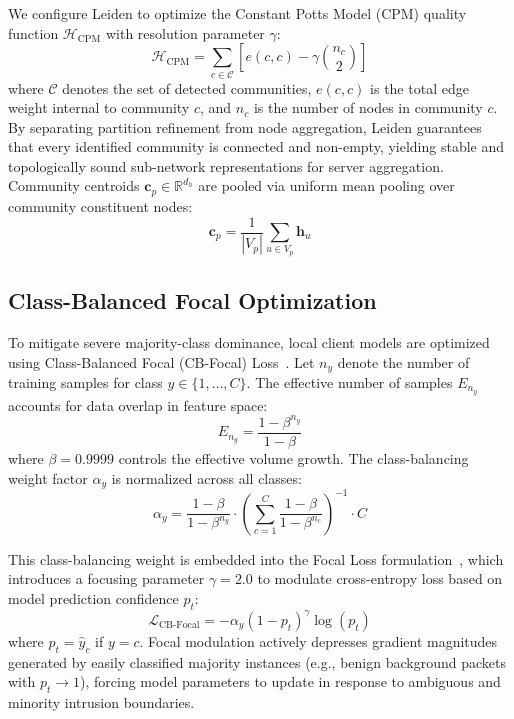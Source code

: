 \documentclass[journal,onecolumn]{IEEEtran}
\begin{document}
We configure Leiden to optimize the Constant Potts Model (CPM) quality function $\mathcal{H}_{\text{CPM}}$ with resolution parameter $\gamma$:
\begin{equation}
\mathcal{H}_{\text{CPM}} = \sum_{c \in \mathcal{C}} \left[ e(c, c) - \gamma \binom{n_c}{2} \right]
\label{eq:leiden_cpm}
\end{equation}
where $\mathcal{C}$ denotes the set of detected communities, $e(c, c)$ is the total edge weight internal to community $c$, and $n_c$ is the number of nodes in community $c$. By separating partition refinement from node aggregation, Leiden guarantees that every identified community is connected and non-empty, yielding stable and topologically sound sub-network representations for server aggregation. Community centroids $\boldsymbol{c}_p \in \mathbb{R}^{d_h}$ are pooled via uniform mean pooling over community constituent nodes:
\begin{equation}
\boldsymbol{c}_p = \frac{1}{|V_p|} \sum_{u \in V_p} \boldsymbol{h}_u
\label{eq:community_pooling}
\end{equation}

\subsection{Class-Balanced Focal Optimization}
To mitigate severe majority-class dominance, local client models are optimized using Class-Balanced Focal (CB-Focal) Loss~\cite{cui2019cbloss, lin2017focal}. Let $n_y$ denote the number of training samples for class $y \in \{1, \dots, C\}$. The effective number of samples $E_{n_y}$ accounts for data overlap in feature space:
\begin{equation}
E_{n_y} = \frac{1 - \beta^{n_y}}{1 - \beta}
\label{eq:effective_samples}
\end{equation}
where $\beta = 0.9999$ controls the effective volume growth. The class-balancing weight factor $\alpha_y$ is normalized across all classes:
\begin{equation}
\alpha_y = \frac{1 - \beta}{1 - \beta^{n_y}} \cdot \left( \sum_{c=1}^C \frac{1 - \beta}{1 - \beta^{n_c}} \right)^{-1} \cdot C
\label{eq:cb_weights}
\end{equation}

This class-balancing weight is embedded into the Focal Loss formulation~\cite{lin2017focal}, which introduces a focusing parameter $\gamma = 2.0$ to modulate cross-entropy loss based on model prediction confidence $p_t$:
\begin{equation}
\mathcal{L}_{\text{CB-Focal}} = - \alpha_y (1 - p_t)^\gamma \log(p_t)
\label{eq:cb_focal_loss}
\end{equation}
where $p_t = \hat{y}_c$ if $y = c$. Focal modulation actively depresses gradient magnitudes generated by easily classified majority instances (e.g., benign background packets with $p_t \to 1$), forcing model parameters to update in response to ambiguous and minority intrusion boundaries.
\end{document}
